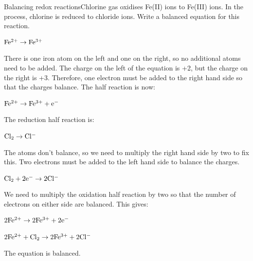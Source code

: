 \begin{wex}{Balancing redox reactions}{Chlorine gas oxidises Fe(II) ions to Fe(III) ions. In the process, chlorine is reduced to chloride ions. Write a balanced equation for this reaction.}{
\begin{center}
$\rm{Fe^{2+} \rightarrow Fe^{3+}}$\\
\end{center}
There is one iron atom on the left and one on the right, so no additional atoms need to be added.
The charge on the left of the equation is +2, but the charge on the right is +3. Therefore, one electron must be added to the right hand side so that the charges balance. The half reaction is now:
\begin{center}
$\rm{Fe^{2+} \rightarrow Fe^{3+} + e^{-}}$
\end{center}
The reduction half reaction is:
\begin{center}
$\rm{Cl_{2} \rightarrow Cl^{-}}$
\end{center}
The atoms don't balance, so we need to multiply the right hand side by two to fix this. Two electrons must be added to the left hand side to balance the charges.
\begin{center}
$\rm{Cl_{2} + 2e^{-} \rightarrow 2Cl^{-}}$
\end{center}
We need to multiply the oxidation half reaction by two so that the number of electrons on either side are balanced. This gives:
\begin{center}
$\rm{2Fe^{2+} \rightarrow 2Fe^{3+} + 2e^{-}}$
\end{center}
\begin{center}
$\rm{2Fe^{2+} + Cl_{2} \rightarrow 2Fe^{3+} + 2Cl^{-}}$
\end{center}
The equation is balanced.
}
\end{wex}

